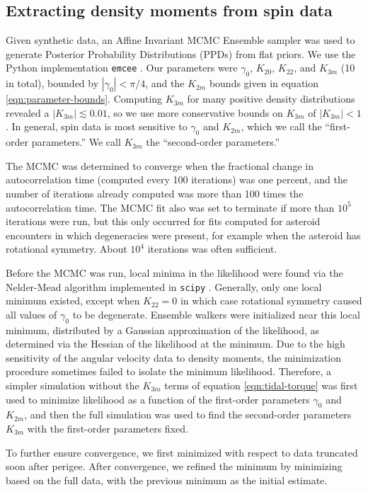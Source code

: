 \documentclass[fleqn,usenatbib]{mnras}
\begin{document}
\subsection{Extracting density moments from spin data}
\label{sec:fit}
Given synthetic data, an Affine Invariant MCMC Ensemble sampler was used to generate Posterior Probability Distributions (PPDs) from flat priors. We use the Python implementation \texttt{emcee} \cite{foreman2013emcee}. Our parameters were $\gamma_0$, $K_{20}$, $K_{22}$, and $K_{3m}$ (10 in total), bounded by $|\gamma_0| < \pi/4$, and the $K_{2 m}$ bounds given in equation \ref{eqn:parameter-bounds}. Computing $K_{3m}$ for many positive density distributions revealed a $|K_{3m}| \lesssim 0.01$, so we use more conservative bounds on $K_{3 m}$ of $|K_{3 m}| < 1$. In general, spin data is most sensitive to $\gamma_0$ and $K_{2m}$, which we call the ``first-order parameters.'' We call $K_{3m}$ the ``second-order parameters.''

The MCMC was determined to converge when the fractional change in autocorrelation time (computed every 100 iterations) was one percent, and the number of iterations already computed was more than 100 times the autocorrelation time. The MCMC fit also was set to terminate if more than $10^5$ iterations were run, but this only occurred for fits computed for asteroid encounters in which degeneracies were present, for example when the asteroid has rotational symmetry. About $10^4$ iterations was often sufficient.

Before the MCMC was run, local minima in the likelihood were found via the Nelder-Mead algorithm implemented in \texttt{scipy} \cite{Gao2012}. Generally, only one local minimum existed, except when $K_{22}=0$ in which case rotational symmetry caused all values of $\gamma_0$ to be degenerate. Ensemble walkers were initialized near this local minimum, distributed by a Gaussian approximation of the likelihood, as determined via the Hessian of the likelihood at the minimum. Due to the high sensitivity of the angular velocity data to density moments, the minimization procedure sometimes failed to isolate the minimum likelihood. Therefore, a simpler simulation without the $K_{3m}$ terms of equation \ref{eqn:tidal-torque} was first used to minimize likelihood as a function of the first-order parameters $\gamma_0$ and $K_{2m}$, and then the full simulation was used to find the second-order parameters $K_{3m}$ with the first-order parameters fixed.

To further ensure convergence, we first minimized with respect to data truncated soon after perigee. After convergence, we refined the minimum by minimizing based on the full data, with the previous minimum as the initial estimate.
\end{document}
